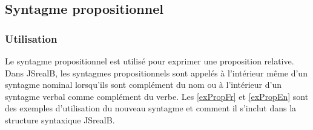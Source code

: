\documentclass[11pt]{article} %
\newcommand{\system}[1]{\textsf{#1}}
\newcommand{\JSB}{\system{JSrealB}}
\begin{document}
\subsection{Syntagme propositionnel}
\label{syntProp}

\subsubsection{Utilisation}

Le syntagme propositionnel est utilisé pour exprimer une proposition
relative. Dans \JSB{}, les syntagmes propositionnels sont appelés
à l'intérieur même d'un syntagme nominal lorsqu'ils sont complément
du nom ou à l'intérieur d'un syntagme verbal comme complément du verbe.
Les \autoref{exPropFr} et \autoref{exPropEn} sont des exemples 
d'utilisation du nouveau syntagme et comment
il s'inclut dans la structure syntaxique \JSB{}.
\end{document}
